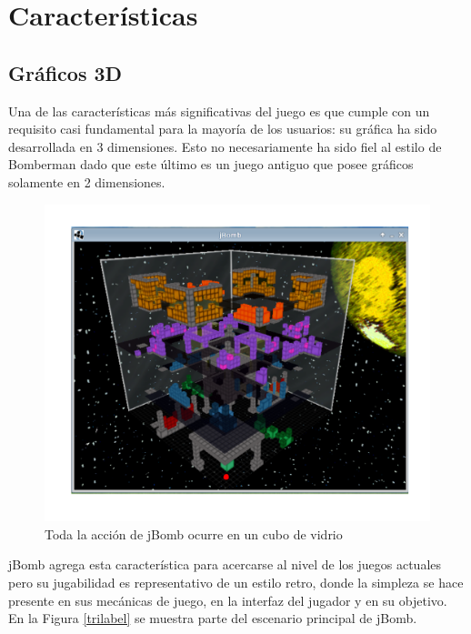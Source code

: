 \documentclass[a4paper,12pt,openany,oneside]{book}
\begin{document}
\section{Características}
\subsection{Gráficos 3D}
Una de las características más significativas del juego es que cumple con un requisito casi fundamental para la mayoría de los usuarios: su gráfica ha sido desarrollada en 3 dimensiones. Esto no necesariamente ha sido fiel al estilo de Bomberman dado que este último es un juego antiguo que posee gráficos solamente en 2 dimensiones.

\begin{figure}
\begin{center}
\includegraphics[scale=.7]{img1.pdf}
\end{center}
\caption[Cubo de escenario]{Toda la acción de jBomb ocurre en un cubo de vidrio}
\end{figure}

jBomb agrega esta característica para acercarse al nivel de los juegos actuales pero su jugabilidad es representativo de un estilo retro, donde la simpleza se hace presente en sus mecánicas de juego, en la interfaz del jugador y en su objetivo. En la Figura \ref{trilabel} se muestra parte del escenario principal de jBomb.
\end{document}

